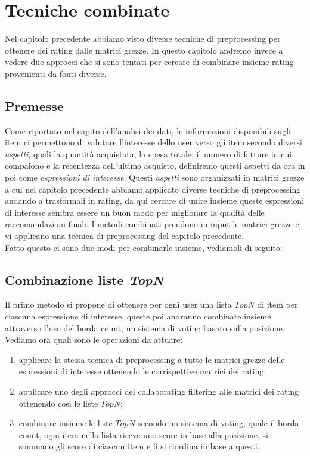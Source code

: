 \hypertarget{(chap:capitolo5)}{}
\chapter{Tecniche combinate}
Nel capitolo precedente abbiamo visto diverse tecniche di preprocessing per ottenere dei rating dalle matrici grezze.
In questo capitolo andremo invece a vedere due approcci che si sono tentati per cercare di combinare insieme rating provenienti da fonti diverse.
\section{Premesse}
Come riportato nel capito dell'analisi dei dati, le informazioni disponibili sugli item ci permettono di valutare l'interesse dello user verso gli item secondo diversi \textit{aspetti}, quali la quantità acquistata, la spesa totale, il numero di fatture in cui compaiono e la recentezza dell'ultimo acquisto, definiremo questi aspetti da ora in poi come \textit{espressioni di interesse}.
Questi \textit{aspetti} sono organizzati in matrici grezze a cui nel capitolo precedente abbiamo applicato diverse tecniche di preprocessing andando a trasformali in rating, da qui cercare di unire insieme queste espressioni di interesse sembra essere un buon modo per migliorare la qualità delle raccomandazioni finali.
I metodi combinati prendono in input le matrici grezze e vi applicano una tecnica di preprocessing del capitolo precedente.\\
Fatto questo ci sono due modi per combinarle insieme, vediamoli di seguito:

\section{Combinazione liste \textit{TopN}}
Il primo metodo si propone di ottenere per ogni user una lista $TopN$ di item per ciascuna espressione di interesse, queste poi andranno combinate insieme attraverso l'uso del borda count, un sistema di voting basato sulla posizione.
Vediamo ora quali sono le operazioni da attuare:
\begin{enumerate}
    \item applicare la stessa tecnica di preprocessing a tutte le matrici grezze delle espressioni di interesse ottenendo le corrispettive matrici dei rating;
    \item applicare uno degli approcci del collaborating filtering alle matrici dei rating ottenendo così le liste $TopN$;
    \item combinare insieme le liste $TopN$ secondo un sistema di voting, quale il borda count, ogni item nella lista riceve uno score in base alla posizione, si sommano gli score di ciascun item e li si riordina in base a questi.
\end{enumerate}

